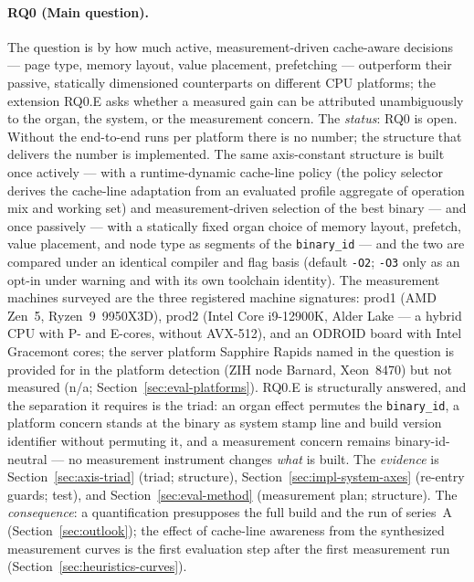 \begin{nurlang}
\paragraph{RQ0 (Main question).} The question is by how much active, measurement-driven cache-aware
decisions --- page type, memory layout, value placement, prefetching --- outperform their passive,
statically dimensioned counterparts on different CPU platforms; the extension RQ0.E asks whether a
measured gain can be attributed unambiguously to the organ, the system, or the measurement concern.
The \emph{status}: RQ0 is open. Without the end-to-end runs per platform there is no number; the
structure that delivers the number is implemented. The same axis-constant structure is built once
actively --- with a runtime-dynamic cache-line policy (the policy selector derives the cache-line
adaptation from an evaluated profile aggregate of operation mix and working set) and
measurement-driven selection of the best binary --- and once passively --- with a statically fixed
organ choice of memory layout, prefetch, value placement, and node type as segments of the
\texttt{binary\_id} --- and the two are compared under an identical compiler and flag basis
(default \texttt{-O2}; \texttt{-O3} only as an opt-in under warning and with its own toolchain
identity). The measurement machines surveyed are the three registered machine signatures: prod1
(AMD Zen~5, Ryzen~9~9950X3D), prod2 (Intel Core i9-12900K, Alder Lake --- a hybrid CPU with %
P- and E-cores, without AVX-512), and an ODROID board with Intel Gracemont cores; the server
platform Sapphire Rapids named in the question is provided for in the platform detection (ZIH node
Barnard, Xeon~8470) but not measured (n/a; Section~\ref{sec:eval-platforms}). RQ0.E is structurally
answered, and the separation it requires is the triad: an organ effect permutes the
\texttt{binary\_id}, a platform concern stands at the binary as system stamp line and build version
identifier without permuting it, and a measurement concern remains binary-id-neutral --- no
measurement instrument changes \emph{what} is built. The \emph{evidence} is
Section~\ref{sec:axis-triad} (triad; structure), Section~\ref{sec:impl-system-axes} (re-entry
guards; test), and Section~\ref{sec:eval-method} (measurement plan; structure). The
\emph{consequence}: a quantification presupposes the full build and the run of series~A
(Section~\ref{sec:outlook}); the effect of cache-line awareness from the synthesized measurement
curves is the first evaluation step after the first measurement run
(Section~\ref{sec:heuristics-curves}).
\end{nurlang}
